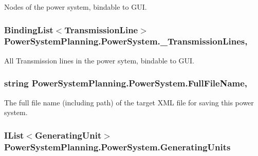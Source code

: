 Nodes of the power system, bindable to G\+UI. 

\subsubsection[{\texorpdfstring{\+\_\+\+Transmission\+Lines}{_TransmissionLines}}]{\setlength{\rightskip}{0pt plus 5cm}Binding\+List$<${\bf Transmission\+Line}$>$ Power\+System\+Planning.\+Power\+System.\+\_\+\+Transmission\+Lines\hspace{0.3cm}{\ttfamily [get]}, {}}\hypertarget{class_power_system_planning_1_1_power_system_a88e97e6852c0105b86408ff9753163ba}{}\label{class_power_system_planning_1_1_power_system_a88e97e6852c0105b86408ff9753163ba}


All Transmission lines in the power sytem, bindable to G\+UI. 

\subsubsection[{\texorpdfstring{Full\+File\+Name}{FullFileName}}]{\setlength{\rightskip}{0pt plus 5cm}string Power\+System\+Planning.\+Power\+System.\+Full\+File\+Name\hspace{0.3cm}{\ttfamily [get]}, {\ttfamily [set]}}\hypertarget{class_power_system_planning_1_1_power_system_abf9f7281d0dd5e23a567c6ddef5f8b91}{}\label{class_power_system_planning_1_1_power_system_abf9f7281d0dd5e23a567c6ddef5f8b91}


The full file name (including path) of the target X\+ML file for saving this power system. 

\subsubsection[{\texorpdfstring{Generating\+Units}{GeneratingUnits}}]{\setlength{\rightskip}{0pt plus 5cm}I\+List$<${\bf Generating\+Unit}$>$ Power\+System\+Planning.\+Power\+System.\+Generating\+Units\hspace{0.3cm}{\ttfamily [get]}}\hypertarget{class_power_system_planning_1_1_power_system_aee8ba3b28d3f43e64484359f71cb35fd}{}\label{class_power_system_planning_1_1_power_system_aee8ba3b28d3f43e64484359f71cb35fd}


